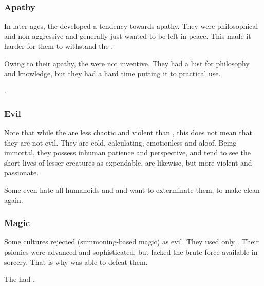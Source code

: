 \subsubsection{Apathy}
In later ages, the \quiljaaran developed a tendency towards apathy. 
They were philosophical and non-aggressive and generally just wanted to be left in peace. 
This made it harder for them to withstand the . 

Owing to their apathy, the \quiljaaran were not inventive. 
They had a lust for philosophy and knowledge, but they had a hard time putting it to practical use. 

. 





\subsubsection{Evil}
Note that while the \ophidians{} are less chaotic and violent than \dragons, this does not mean that they are not evil. 
They are cold, calculating, emotionless and aloof. 
Being immortal, they possess inhuman patience and perspective, and tend to see the short lives of lesser creatures as expendable. 
\Dragons{} are likewise, but more violent and passionate. 


Some \trueophidians{} even hate all humanoids and \dragons{} and want to exterminate them, to make \Miith{} clean again.





\subsubsection{Magic}
Some \ophidian{} cultures rejected  (summoning-based magic) as evil. 
They used only . 
Their psionics were advanced and sophisticated, but lacked the brute force available in sorcery. 
That is why  was able to defeat them. 

The {\quiljaaran} had . 





